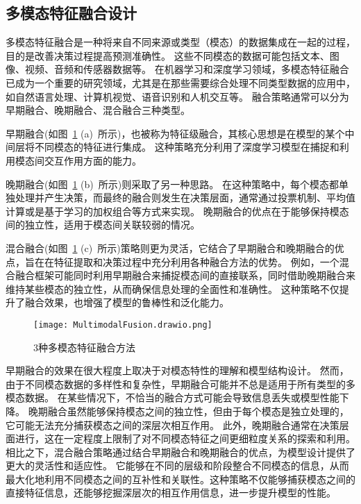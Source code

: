 \subsection{多模态特征融合设计}
多模态特征融合是一种将来自不同来源或类型（模态）的数据集成在一起的过程，目的是改善决策过程提高预测准确性。
这些不同模态的数据可能包括文本、图像、视频、音频和传感器数据等。
在机器学习和深度学习领域，多模态特征融合已成为一个重要的研究领域，尤其是在那些需要综合处理不同类型数据的应用中，如自然语言处理、计算机视觉、语音识别和人机交互等。
融合策略通常可以分为早期融合、晚期融合、混合融合三种类型\cite{hejunandzhangcaiqing}。\par

早期融合(如图~\ref{fig:MultimodalFusio} (a)~所示)，也被称为特征级融合，其核心思想是在模型的某个中间层将不同模态的特征进行集成。
这种策略充分利用了深度学习模型在捕捉和利用模态间交互作用方面的能力。\par

晚期融合(如图~\ref{fig:MultimodalFusio} (b)~所示)则采取了另一种思路。
在这种策略中，每个模态都单独处理并产生决策，而最终的融合则发生在决策层面，通常通过投票机制、平均值计算或是基于学习的加权组合等方式来实现。
晚期融合的优点在于能够保持模态间的独立性，适用于模态间关联较弱的情况。\par

混合融合(如图~\ref{fig:MultimodalFusio} (c)~所示)策略则更为灵活，它结合了早期融合和晚期融合的优点，旨在在特征提取和决策过程中充分利用各种融合方法的优势。
例如，一个混合融合框架可能同时利用早期融合来捕捉模态间的直接联系，同时借助晚期融合来维持某些模态的独立性，从而确保信息处理的全面性和准确性。
这种策略不仅提升了融合效果，也增强了模型的鲁棒性和泛化能力。\par

\begin{figure}[h]
	\centering
	\texttt{[image: MultimodalFusion.drawio.png]}
	\caption{3种多模态特征融合方法}
	\label{fig:MultimodalFusio}
\end{figure}


早期融合的效果在很大程度上取决于对模态特性的理解和模型结构设计。
然而，由于不同模态数据的多样性和复杂性，早期融合可能并不总是适用于所有类型的多模态数据。
在某些情况下，不恰当的融合方式可能会导致信息丢失或模型性能下降。
晚期融合虽然能够保持模态之间的独立性，但由于每个模态是独立处理的，它可能无法充分捕获模态之间的深层次相互作用。
此外，晚期融合通常在决策层面进行，这在一定程度上限制了对不同模态特征之间更细粒度关系的探索和利用。
相比之下，混合融合策略通过结合早期融合和晚期融合的优点，为模型设计提供了更大的灵活性和适应性。
它能够在不同的层级和阶段整合不同模态的信息，从而最大化地利用不同模态之间的互补性和关联性。这种策略不仅能够捕获模态之间的直接特征信息，还能够挖掘深层次的相互作用信息，进一步提升模型的性能。\par




